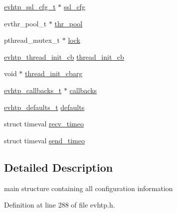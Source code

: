 \begin{DoxyCompactItemize}
\hyperlink{evhtp_8h_adb4d7b6af31986dd5a7a33f5ac41dde6}{evhtp\-\_\-ssl\-\_\-cfg\-\_\-t} $\ast$ \hyperlink{structevhtp__s_afb6cdde78523e94fa84f57e55280513f}{ssl\-\_\-cfg}
\item 
evthr\-\_\-pool\-\_\-t $\ast$ \hyperlink{structevhtp__s_a350014aec537fdf8ef6f82efe17d5757}{thr\-\_\-pool}
\item 
pthread\-\_\-mutex\-\_\-t $\ast$ \hyperlink{structevhtp__s_a33586b4184d23f2b8f4df153ec23af13}{lock}
\item 
\hyperlink{evhtp_8h_add7ca63c155e4e9f116dd6972a32782a}{evhtp\-\_\-thread\-\_\-init\-\_\-cb} \hyperlink{structevhtp__s_af7bcd46ddf1d6d7dde1383c28f746e97}{thread\-\_\-init\-\_\-cb}
\item 
void $\ast$ \hyperlink{structevhtp__s_aa7d8ed7967f5071085f57741dde79056}{thread\-\_\-init\-\_\-cbarg}
\item 
\hyperlink{evhtp_8h_a9570ba758e99f90fc29f4b427953e6a5}{evhtp\-\_\-callbacks\-\_\-t} $\ast$ \hyperlink{structevhtp__s_a43bc08d49284feb774b73ee06cf0a769}{callbacks}
\item 
\hyperlink{evhtp_8h_ac6661001dc475c8e25760071e26311e1}{evhtp\-\_\-defaults\-\_\-t} \hyperlink{structevhtp__s_a5ca39f6268aea8173dbdc0a1e297925b}{defaults}
\item 
struct timeval \hyperlink{structevhtp__s_a485801666b7fb0cccc50d9fa42e5cbb9}{recv\-\_\-timeo}
\item 
struct timeval \hyperlink{structevhtp__s_a7ffa291d73974047489f8880e5363603}{send\-\_\-timeo}
\end{DoxyCompactItemize}


\subsection{Detailed Description}
main structure containing all configuration information 

Definition at line 288 of file evhtp.\-h.



